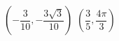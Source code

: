 { $\left( -\dfrac{3}{10}, -\dfrac{3\sqrt{3}}{10} \right)$}
{ $\left( \dfrac{3}{5}, \dfrac{4\pi}{3} \right)$}
